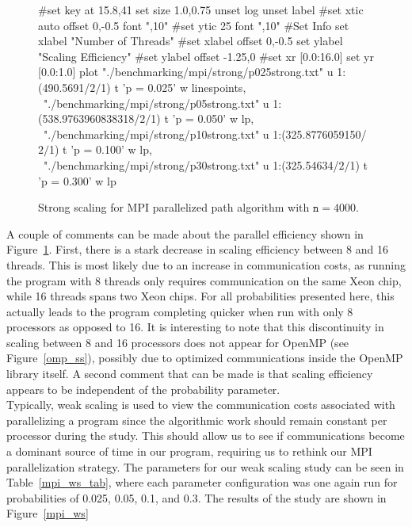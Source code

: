 \documentclass[11pt]{article}
\begin{document}
\begin{figure}[h]
	\begin{center}
		\begin{gnuplot}[terminal=cairolatex, terminaloptions= color] 
			#set key at 15.8,41
			set size 1.0,0.75              
			unset log                          
			unset label                          
			#set xtic auto offset 0,-0.5 font ",10"                     
			#set ytic 25 font ",10" 
			#Set Info
			set xlabel "Number of Threads"
			#set xlabel offset 0,-0.5
			set ylabel "Scaling Efficiency"
			#set ylabel offset -1.25,0
			#set xr [0.0:16.0]
			set yr [0.0:1.0]
			plot "./benchmarking/mpi/strong/p025strong.txt" u 1:(490.5691/$2/$1) t 'p = 0.025' w linespoints, \
			"./benchmarking/mpi/strong/p05strong.txt" u 1:(538.9763960838318/$2/$1) t 'p = 0.050' w lp, \
			"./benchmarking/mpi/strong/p10strong.txt" u 1:(325.8776059150/$2/$1) t 'p = 0.100' w lp, \
			"./benchmarking/mpi/strong/p30strong.txt" u 1:(325.54634/$2/$1) t 'p = 0.300' w lp
		\end{gnuplot}
		\caption{Strong scaling for MPI parallelized path algorithm with $\mathtt{n} = 4000$.}
		\label{mpi_ss}
	\end{center}
\end{figure}
\noindent A couple of comments can be made about the parallel efficiency shown in Figure~\ref{mpi_ss}. First, there is a stark decrease in scaling efficiency between 8 and 16 threads. This is most likely due to an increase in communication costs, as running the program with 8 threads only requires communication on the same Xeon chip, while 16 threads spans two Xeon chips. For all probabilities presented here, this actually leads to the program completing quicker when run with only 8 processors as opposed to 16. It is interesting to note that this discontinuity in scaling between 8 and 16 processors does not appear for OpenMP (see Figure~\ref{omp_ss}), possibly due to optimized communications inside the OpenMP library itself. A second comment that can be made is that scaling efficiency appears to be independent of the probability parameter. \\

\noindent Typically, weak scaling is used to view the communication costs associated with parallelizing a program since the algorithmic work should remain constant per processor during the study. This should allow us to see if communications become a dominant source of time in our program, requiring us to rethink our MPI parallelization strategy. The parameters for our weak scaling study can be seen in Table~\ref{mpi_ws_tab}, where each parameter configuration was one again run for probabilities of 0.025, 0.05, 0.1, and 0.3. The results of the study are shown in Figure~\ref{mpi_ws}
\end{document}
